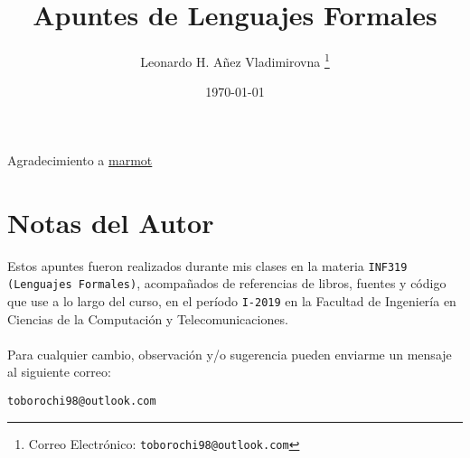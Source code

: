 

\title{Apuntes de Lenguajes Formales}

\author{Leonardo H. Añez Vladimirovna%
  \thanks{Correo Electrónico: \texttt{toborochi98@outlook.com}}}
\date{\today}

\maketitle

Agradecimiento a \href{https://tex.stackexchange.com/users/121799/marmot}{marmot}

\section*{Notas del Autor}
Estos apuntes fueron realizados durante mis clases en la materia \texttt{INF319 (Lenguajes Formales)}, acompañados de referencias de libros, fuentes y código que use a lo largo del curso, en el período \texttt{I-2019} en la Facultad de Ingeniería en Ciencias de la Computación y Telecomunicaciones. 
\\ \vspace{0.5cm} \\
Para cualquier cambio, observación y/o sugerencia pueden enviarme un mensaje al siguiente correo:
\begin{center}
 \texttt{toborochi98@outlook.com}
\end{center}

\tableofcontents
